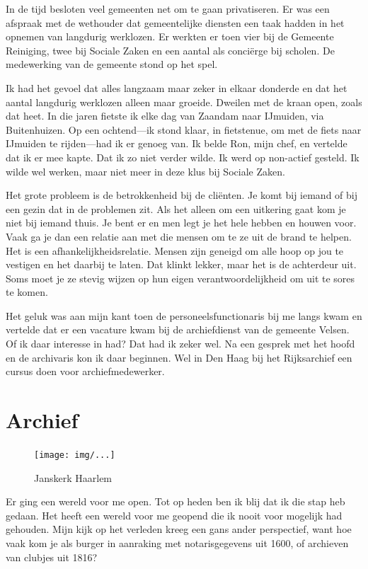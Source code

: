 \documentclass[12pt,twoside]{memoir}
\begin{document}
In de tijd besloten veel gemeenten net om te gaan privatiseren. Er was een afspraak met de wethouder dat gemeentelijke diensten een taak hadden in het opnemen van langdurig werklozen. Er werkten er toen vier bij de Gemeente Reiniging, twee bij Sociale Zaken en een aantal als conciërge bij scholen. De medewerking van de gemeente stond op het spel. 

Ik had het gevoel dat alles langzaam maar zeker in elkaar donderde en dat het aantal langdurig werklozen alleen maar groeide. Dweilen met de kraan open, zoals dat heet. In die jaren fietste ik elke dag van Zaandam naar IJmuiden, via Buitenhuizen. Op een ochtend---ik stond klaar, in fietstenue, om met de fiets naar IJmuiden te rijden---had ik er genoeg van. Ik belde Ron, mijn chef, en vertelde dat ik er mee kapte. Dat ik zo niet verder wilde. Ik werd op non-actief gesteld. Ik wilde wel werken, maar niet meer in deze klus bij Sociale Zaken.

Het grote probleem is de betrokkenheid bij de cliënten. Je komt bij iemand of bij een gezin dat in de problemen zit. Als het alleen om een uitkering gaat kom je niet bij iemand thuis. Je bent er en men legt je het hele hebben en houwen voor. Vaak ga je dan een relatie aan met die mensen om te ze uit de brand te helpen. Het is een afhankelijkheidsrelatie. Mensen zijn geneigd om alle hoop op jou te vestigen en het daarbij te laten. Dat klinkt lekker, maar het is de achterdeur uit. Soms moet je ze stevig wijzen op hun eigen verantwoordelijkheid om uit te sores te komen. 

Het geluk was aan mijn kant toen de personeelsfunctionaris bij me langs kwam en vertelde dat er een vacature kwam bij de archiefdienst van de gemeente Velsen. Of ik daar interesse in had? Dat had ik zeker wel. Na een gesprek met het hoofd en de archivaris kon ik daar beginnen. Wel in Den Haag bij het Rijksarchief een cursus doen voor archiefmedewerker. 

\chapter{Archief} %
\label{cha:archief}

\begin{figure}[t]
\texttt{[image: img/...]}
\caption{Janskerk Haarlem}
\end{figure}

Er ging een wereld voor me open. Tot op heden ben ik blij dat ik die stap heb gedaan. Het heeft een wereld voor me geopend die ik nooit voor mogelijk had gehouden. Mijn kijk op het verleden kreeg een gans ander perspectief, want hoe vaak kom je als burger in aanraking met notarisgegevens uit 1600, of archieven van clubjes uit 1816?
\end{document}
